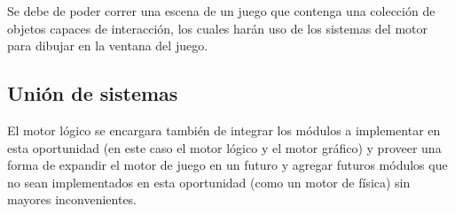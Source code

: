 Se debe de poder correr una escena de un juego que contenga una colección de objetos capaces de interacción, los cuales harán uso de los sistemas del motor para dibujar en la ventana del juego.

\subsection{Unión de sistemas}

El motor lógico se encargara también de integrar los módulos a implementar en esta oportunidad (en este caso el motor lógico y el motor gráfico) y proveer una forma de expandir el motor de juego en un futuro y agregar futuros módulos que no sean implementados en esta oportunidad (como un motor de física) sin mayores inconvenientes.
